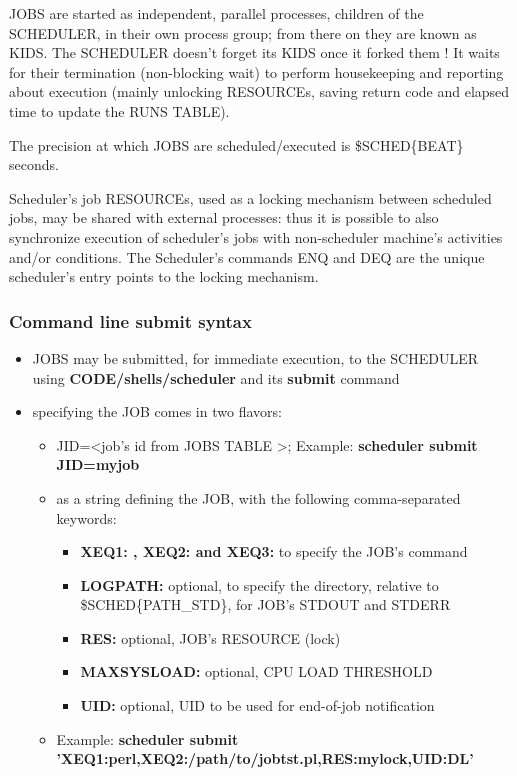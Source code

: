 JOBS are started as independent, parallel processes, children of the SCHEDULER, in their own process group; from there on they are known as KIDS.   
The SCHEDULER doesn't forget its KIDS once it forked them ! It waits for their termination (non-blocking wait) to perform housekeeping and reporting
about execution (mainly unlocking RESOURCEs, saving return code and elapsed time to update the RUNS TABLE). 

The precision at which JOBS are scheduled/executed is \$SCHED\{BEAT\} seconds.

Scheduler's job RESOURCEs, used as a locking mechanism between scheduled jobs, may be shared with external processes: thus it is possible
to also synchronize execution of scheduler's jobs with non-scheduler machine's activities and/or conditions. 
The Scheduler's commands ENQ and DEQ are the unique scheduler's entry points to the locking mechanism.  

\subsubsection{Command line submit syntax}

\begin{itemize}
\item   JOBS may be submitted, for immediate execution, to the SCHEDULER using \textbf{CODE/shells/scheduler} and its \textbf{submit} command
\item   specifying the JOB comes in two flavors:
\begin{itemize}
\item   JID=\textless job's id from JOBS TABLE \textgreater ; Example: \textbf{scheduler submit JID=myjob}
\item   as a string defining the JOB, with the following comma-separated keywords:
\begin{itemize}
\item   \textbf{XEQ1: , XEQ2: and XEQ3:} to specify the JOB's command
\item   \textbf{LOGPATH:} optional, to specify the directory, relative to \$SCHED\{PATH\_STD\}, for JOB's STDOUT and STDERR
\item   \textbf{RES:} optional, JOB's RESOURCE (lock)
\item   \textbf{MAXSYSLOAD:} optional, CPU LOAD THRESHOLD
\item   \textbf{UID:} optional, UID to be used for end-of-job notification
\end{itemize}
\item   Example:  \textbf{scheduler submit 'XEQ1:perl,XEQ2:/path/to/jobtst.pl,RES:mylock,UID:DL'}
\end{itemize}
\end{itemize}

